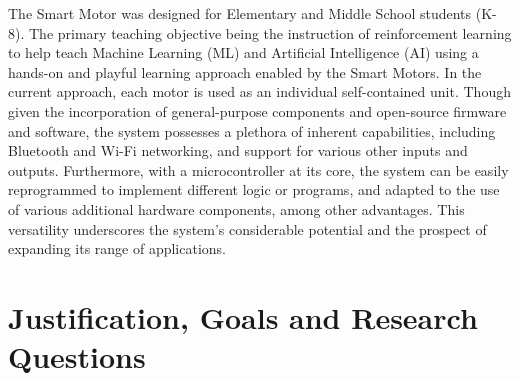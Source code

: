 The Smart Motor was designed for Elementary and Middle School students (K-8). The primary teaching objective being the instruction of reinforcement learning to help teach Machine Learning (ML) and Artificial Intelligence (AI) using a hands-on and playful learning approach enabled by the Smart Motors. In the current approach, each motor is used as an individual self-contained unit. Though given the incorporation of general-purpose components and open-source firmware and software, the system possesses a plethora of inherent capabilities, including Bluetooth and Wi-Fi networking, and support for various other inputs and outputs. Furthermore, with a microcontroller at its core, the system can be easily reprogrammed to implement different logic or programs, and adapted to the use of various additional hardware components, among other advantages. This versatility underscores the system's considerable potential and the prospect of expanding its range of applications. \citep{dahal_designing_2024}

\section{\label{sec:intro_res_quest}Justification, Goals and Research Questions}

